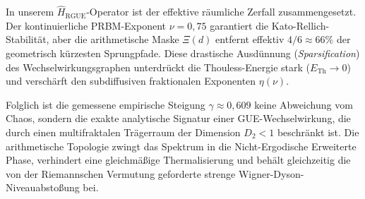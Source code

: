 \documentclass[aps,prl,preprint,superscriptaddress,floatfix]{revtex4-2}
\begin{document}
In unserem $\hat{H}_{\text{RGUE}}$-Operator ist der effektive räumliche Zerfall zusammengesetzt. Der kontinuierliche PRBM-Exponent $\nu=0,75$ garantiert die Kato-Rellich-Stabilität, aber die arithmetische Maske $\Xi(d)$ entfernt effektiv $4/6 \approx 66\%$ der geometrisch kürzesten Sprungpfade. Diese drastische Ausdünnung (\textit{Sparsification}) des Wechselwirkungsgraphen unterdrückt die Thouless-Energie stark ($E_{\text{Th}} \to 0$) und verschärft den subdiffusiven fraktionalen Exponenten $\eta(\nu)$.

Folglich ist die gemessene empirische Steigung $\gamma \approx 0,609$ keine Abweichung vom Chaos, sondern die exakte analytische Signatur einer GUE-Wechselwirkung, die durch einen multifraktalen Trägerraum der Dimension $D_2 < 1$ beschränkt ist. Die arithmetische Topologie zwingt das Spektrum in die Nicht-Ergodische Erweiterte Phase, verhindert eine gleichmäßige Thermalisierung und behält gleichzeitig die von der Riemannschen Vermutung geforderte strenge Wigner-Dyson-Niveauabstoßung bei.



\end{document}
